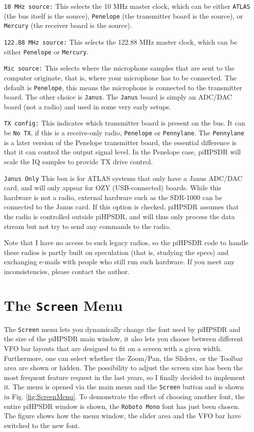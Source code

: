 \documentclass[12pt]{book}
\def\rett#1{\texttt{\color{red}#1}}
\def\bltt#1{\texttt{\color{blue}#1}}
\def\pH{pi\-HPSDR\xspace}
\begin{document}
\rett{10 MHz source:} This selects the 10 MHz master clock, which can be either \texttt{ATLAS}
(the bus itself is the source), \texttt{Penelope} (the transmitter board is the source),
or \texttt{Mercury} (the receiver board is the source).

\rett{122.88 MHz source:} This selects the 122.88 MHz master clock, which can be either
\texttt{Penelope} or \texttt{Mercury}.

\rett{Mic source:} This selects where the microphone samples that are sent to the computer
originate, that is, where your microphone has to be connected. The default is
\texttt{Penelope}, this means the microphone is connected to the transmitter board. The
other choice is \texttt{Janus}. The \texttt{Janus} board is simply an ADC/DAC board (not
a radio) and used in some very early setups.

\rett{TX config:} This indicates which transmitter board is present on the bus. It can
be \texttt{No TX}, if this is a receive-only radio, \texttt{Penelope} or \texttt{Pennylane}.
The \texttt{Pennylane} is a later version of the Penelope transmitter board, the essential
difference is that it can control the output signal level. In the Penelope case,
\pH will scale the IQ samples to provide TX drive control.

\rett{Janus Only} This box is for ATLAS systems that only have a Janus ADC/DAC card,
and will only appear for OZY (USB-connected) boards. While this hardware is not a radio,
external hardware such as the SDR-1000 can be connected to the Janus card. If this
option is checked, \pH assumes that the radio is controlled outside \pH, and
will thus only process the data stream but not try to send any commands to the radio.

Note that I have no access to such legacy radios, so the \pH code to handle these radios
is partly built on speculation (that is, studying the specs) and exchanging e-mails with
people who still run such hardware. If you meet any inconsistencies, please contact
the author.

\section{The \texttt{Screen} Menu}

The \bltt{Screen} menu lets you dynamically change the font used by \pH and
the size of the \pH main
window, it also lets you choose between different VFO bar layouts that are designed to fit
on a screen with a given width. Furthermore, one
can select whether the Zoom/Pan, the Sliders, or the Toolbar area are shown or hidden.
The possibility to adjust
the screen size has been the most frequent feature request in the last years,
so I finally decided to implement it. The menu is opened
via the main menu and the \bltt{Screen} button and is shown in Fig. \ref{fig:ScreenMenu}.
To demonstrate the effect of choosing another font, the entire \pH window is shown,
the \rett{Roboto Mono} font has just been chosen. The figure shows how the menu window,
the slider area and the VFO bar have switched to  the new font.
\end{document}
